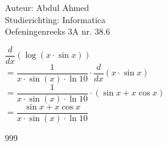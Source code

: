 \documentclass[a4paper]{article}
\begin{document}
  
\noindent \large Auteur: Abdul Ahmed \\
\noindent \large Studierichting:  Informatica\\
\noindent \large Oefeningenreeks 3A nr. 38.6\\

\medskip

\normalsize

 
$\dfrac{d}{dx}( \log (x \cdot \sin x))$\\

$= \dfrac{1}{x \cdot \sin(x)\cdot \ln 10 } \cdot \dfrac{d}{dx}(x\cdot \sin x)$\\

$= \dfrac{1}{x \cdot \sin(x)\cdot \ln 10 } \cdot (\sin x + x\cos x)$\\

$= \dfrac{\sin x + x\cos x}{x \cdot \sin(x)\cdot \ln 10 }$\\







\begin{thebibliography}{999}
\end{thebibliography}
\end{document}
